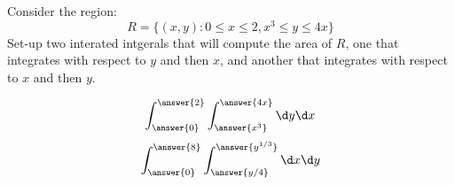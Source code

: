 \documentclass{ximera}
\author{Bart Snapp}
\begin{document}
\begin{exercise}
  Consider the region:
  \[
  R=\{(x,y): 0\le x\le 2, x^3\le y\le 4x\}
  \]
  Set-up two interated intgerals that will compute the area of $R$,
  one that integrates with respect to $y$ and then $x$, and another
  that integrates with respect to $x$ and then $y$.
  \begin{prompt}
    \[
    \int_{\answer{0}}^{\answer{2}} \int_{\answer{x^3}}^{\answer{4x}} \d y \d x
    \]
    \[
    \int_{\answer{0}}^{\answer{8}} \int_{\answer{y/4}}^{\answer{y^{1/3}}} \d x \d y
    \]
  \end{prompt}
\end{exercise}
\end{document}
